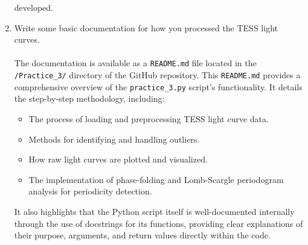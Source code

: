 \documentclass[a4paper,12pt]{article}
\DeclareRobustCommand{\regular}{\fontseries{m}\selectfont}
\DeclareRobustCommand{\bold}{\fontseries{b}\selectfont}
\newcommand{\bcode}[1]{\texttt{\fontsize{11}{13}\selectfont\bold#1}}
\newenvironment{solution}{}{}
\begin{document}
\begin{enumerate}
\begin{solution}
            developed.
        \end{solution}\vspace{-0.5em}
        \item Write some basic documentation for how you processed the TESS light
        curves.
        \begin{solution}
            \\\\\regular The documentation is available as a \bcode{README.md}
            file located in the \bcode{/Practice\_3/} directory of the GitHub
            repository. This \bcode{README.md} provides a comprehensive overview
            of the \bcode{practice\_3.py} script's functionality. It details the
            step-by-step methodology, including:
            \begin{itemize}
                \item The process of loading and preprocessing TESS light curve
                data.
                \item Methods for identifying and handling outliers.
                \item How raw light curves are plotted and visualized.
                \item The implementation of phase-folding and Lomb-Scargle
                periodogram analysis for periodicity detection.
            \end{itemize}
            It also highlights that the Python script itself is well-documented
            internally through the use of docstrings for its functions, providing
            clear explanations of their purpose, arguments, and return values
            directly within the code.


\end{solution}
\end{enumerate}
\end{document}
